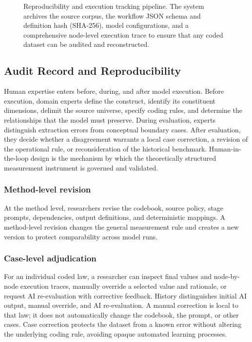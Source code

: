 \documentclass[runningheads]{llncs}
\begin{document}
\begin{figure}[t]
\centering
\resizebox{0.9\textwidth}{!}{}
\caption{Reproducibility and execution tracking pipeline. The system archives the source corpus, the workflow JSON schema and definition hash (SHA-256), model configurations, and a comprehensive node-level execution trace to ensure that any coded dataset can be audited and reconstructed.}
\label{fig:reproducibility}
\end{figure}

\subsection{Audit Record and Reproducibility}

Human expertise enters before, during, and after model execution. Before execution, domain experts define the construct, identify its constituent dimensions, delimit the source universe, specify coding rules, and determine the relationships that the model must preserve. During evaluation, experts distinguish extraction errors from conceptual boundary cases. After evaluation, they decide whether a disagreement warrants a local case correction, a revision of the operational rule, or reconsideration of the historical benchmark. Human-in-the-loop design is the mechanism by which the theoretically structured measurement instrument is governed and validated.

\subsubsection{Method-level revision}

At the method level, researchers revise the codebook, source policy, stage prompts, dependencies, output definitions, and deterministic mappings. A method-level revision changes the general measurement rule and creates a new version to protect comparability across model runs.
\subsubsection{Case-level adjudication}

For an individual coded law, a researcher can inspect final values and node-by-node execution traces, manually override a selected value and rationale, or request AI re-evaluation with corrective feedback. History distinguishes initial AI output, manual override, and AI re-evaluation. A manual correction is local to that law; it does not automatically change the codebook, the prompt, or other cases. Case correction protects the dataset from a known error without altering the underlying coding rule, avoiding opaque automated learning processes.
\end{document}

